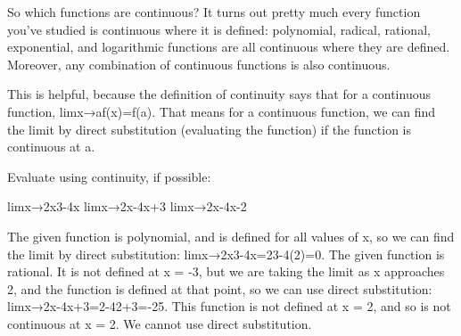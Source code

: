 So which functions are continuous? It turns out pretty much every function you’ve studied is continuous where it is defined: polynomial, radical, rational, exponential, and logarithmic functions are all continuous where they are defined. Moreover, any combination of continuous functions is also continuous.

This is helpful, because the definition of continuity says that for a continuous function, limx→af(x)=f(a). That means for a continuous function, we can find the limit by direct substitution (evaluating the function) if the function is continuous at a.

\begin{example}
Evaluate using continuity, if possible:

limx→2x3-4x
limx→2x-4x+3
limx→2x-4x-2
\begin{solution} The given function is polynomial, and is defined for all values of x, so we can find the limit by direct substitution:
limx→2x3-4x=23-4(2)=0.
The given function is rational. It is not defined at x = -3, but we are taking the limit as x approaches 2, and the function is defined at that point, so we can use direct substitution:
limx→2x-4x+3=2-42+3=-25.
This function is not defined at x = 2, and so is not continuous at x = 2. We cannot use direct substitution.
\end{solution}\end{example}
